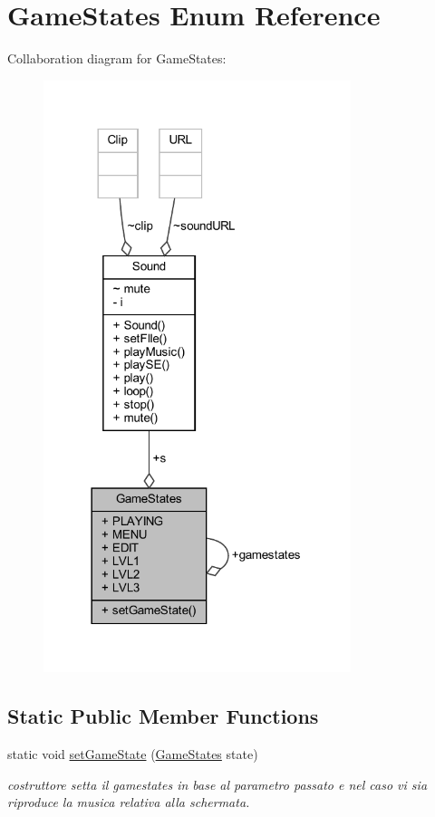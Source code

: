 \hypertarget{enumprogetto_1_1_game_states}{}\section{Game\+States Enum Reference}
\label{enumprogetto_1_1_game_states}


Collaboration diagram for Game\+States\+:
\nopagebreak
\begin{figure}[H]
\begin{center}
\leavevmode
\includegraphics[width=254pt]{enumprogetto_1_1_game_states__coll__graph}
\end{center}
\end{figure}
\subsection*{Static Public Member Functions}
\begin{DoxyCompactItemize}
\item 
static void \hyperlink{enumprogetto_1_1_game_states_a118b00363a0d1055d4b00bb40dd66f34}{set\+Game\+State} (\hyperlink{enumprogetto_1_1_game_states}{Game\+States} state)
\begin{DoxyCompactList}\small\item\em costruttore setta il gamestates in base al parametro passato e nel caso vi sia riproduce la musica relativa alla schermata. \end{DoxyCompactList}\end{DoxyCompactItemize}
